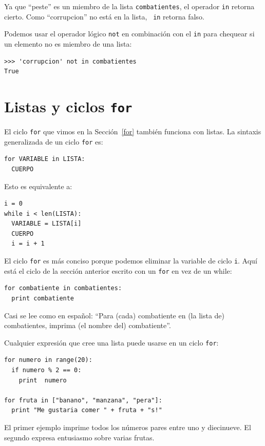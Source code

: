 Ya que  ``peste'' es un miembro de la lista \texttt{combatientes}, el operador \texttt{in}
retorna cierto. Como ``corrupcion'' no está en la lista, {\tt
in} retorna falso.

Podemos usar el operador lógico \texttt{not} en combinación con el
\texttt{in} para chequear si un elemento no es miembro de una lista:

\beforeverb
\begin{verbatim}
>>> 'corrupcion' not in combatientes
True
\end{verbatim}
\afterverb


\section{Listas y ciclos \texttt{for}}

El ciclo  \texttt{for} que vimos en la Sección~\ref{for} también funciona
con listas. La sintaxis generalizada de un ciclo  \texttt{for} es:

\beforeverb
\begin{verbatim}
for VARIABLE in LISTA:
  CUERPO
\end{verbatim}
\afterverb
%
Esto es equivalente a:

\beforeverb
\begin{verbatim}
i = 0
while i < len(LISTA):
  VARIABLE = LISTA[i]
  CUERPO
  i = i + 1
\end{verbatim}
\afterverb
%
El ciclo \texttt{for} es más conciso porque podemos eliminar la 
variable de ciclo \texttt{i}. Aquí está el ciclo de la sección
anterior escrito con un  \texttt{for} en vez de un while:

\beforeverb
\begin{verbatim}
for combatiente in combatientes:
  print combatiente
\end{verbatim}
\afterverb
%
Casi se lee como en español: ``Para  (cada) combatiente
en (la lista de) combatientes, imprima (el nombre del) combatiente''.

Cualquier expresión que cree una lista puede usarse en un ciclo \texttt{for}:

\beforeverb
\begin{verbatim}
for numero in range(20):
  if numero % 2 == 0:
    print  numero

for fruta in ["banano", "manzana", "pera"]:
  print "Me gustaria comer " + fruta + "s!"
\end{verbatim}
\afterverb
%
El primer ejemplo imprime todos los números pares entre uno y diecinueve.
El segundo expresa entusiasmo sobre varias frutas.




